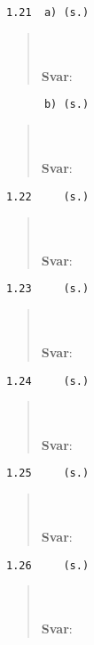 \documentclass[a4paper]{article}
\newcommand{\tskcol}[1]{\textcolor{tskcol}{#1}}
\begin{document}
\texttt{\tskcol{1.21~~a) (s.)}}
\begin{quotation}
	\noindent
	\\ \\
	\textbf{Svar}:
\end{quotation}

\texttt{\tskcol{~~~~~~b) (s.)}}
\begin{quotation}
	\noindent
	\\ \\
	\textbf{Svar}:
\end{quotation}

\texttt{\tskcol{1.22~~~~ (s.)}}
\begin{quotation}
	\noindent
	\\ \\
	\textbf{Svar}:
\end{quotation}

\texttt{\tskcol{1.23~~~~ (s.)}}
\begin{quotation}
	\noindent
	\\ \\
	\textbf{Svar}:
\end{quotation}

\texttt{\tskcol{1.24~~~~ (s.)}}
\begin{quotation}
	\noindent
	\\ \\
	\textbf{Svar}:
\end{quotation}

\texttt{\tskcol{1.25~~~~ (s.)}}
\begin{quotation}
	\noindent
	\\ \\
	\textbf{Svar}:
\end{quotation}

\texttt{\tskcol{1.26~~~~ (s.)}}
\begin{quotation}
	\noindent
	\\ \\
	\textbf{Svar}:
\end{quotation}
\end{document}
